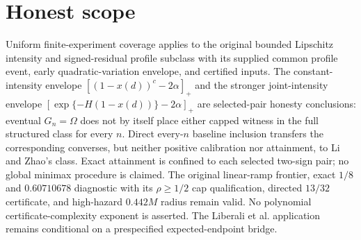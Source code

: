 \documentclass{article}
\begin{document}
\section{Honest scope}

Uniform finite-experiment coverage applies to the original bounded Lipschitz intensity and signed-residual profile subclass with its supplied common profile event, early quadratic-variation envelope, and certified inputs. The constant-intensity envelope \([(1-x(d))^c-2\alpha]_+\) and the stronger joint-intensity envelope \(\left[\exp\{-H(1-x(d))\}-2\alpha\right]_+\) are selected-pair honesty conclusions: eventual \(G_n=\Omega\) does not by itself place either capped witness in the full structured class for every \(n\). Direct every-\(n\) baseline inclusion transfers the corresponding converses, but neither positive calibration nor attainment, to Li and Zhao's class. Exact attainment is confined to each selected two-sign pair; no global minimax procedure is claimed. The original linear-ramp frontier, exact \(1/8\) and \(0.60710678\) diagnostic with its \(\rho\ge1/2\) cap qualification, directed \(13/32\) certificate, and high-hazard \(0.442M\) radius remain valid. No polynomial certificate-complexity exponent is asserted. The Liberali et al. application remains conditional on a prespecified expected-endpoint bridge.
\end{document}
